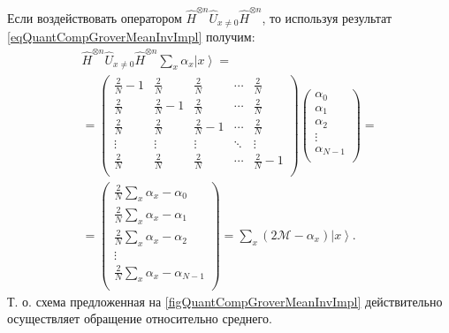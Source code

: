 Если воздействовать оператором $\hat{H}^{\otimes n}\hat{U}_{x \ne
  0}\hat{H}^{\otimes n}$, то используя результат
\eqref{eqQuantCompGroverMeanInvImpl} получим:
\begin{eqnarray}
\hat{H}^{\otimes n}\hat{U}_{x \ne
  0}\hat{H}^{\otimes n} \sum_x \alpha_x \left| x \right> = 
\nonumber \\
=
\begin{pmatrix}
\frac{2}{N} - 1  & \frac{2}{N} & \frac{2}{N} & \cdots & \frac{2}{N} \\
\frac{2}{N} & \frac{2}{N} - 1 & \frac{2}{N} & \cdots & \frac{2}{N} \\
\frac{2}{N} & \frac{2}{N} & \frac{2}{N} - 1 & \cdots & \frac{2}{N} \\
\vdots & \vdots & \vdots & \ddots & \vdots \\
\frac{2}{N} & \frac{2}{N} & \frac{2}{N} & \cdots & \frac{2}{N} - 1\\
\end{pmatrix}
\begin{pmatrix}
\alpha_0 \\
\alpha_1 \\
\alpha_2 \\
\vdots \\
\alpha_{N - 1} \\
\end{pmatrix}
=
\nonumber \\
=
\begin{pmatrix}
\frac{2}{N}\sum_x\alpha_x - \alpha_0\\
\frac{2}{N}\sum_x\alpha_x - \alpha_1\\
\frac{2}{N}\sum_x\alpha_x - \alpha_2\\
\vdots \\
\frac{2}{N}\sum_x\alpha_x - \alpha_{N-1}\\
\end{pmatrix} = 
\sum_x \left(2 \mathcal{M} - \alpha_x \right)\left| x \right>.
\nonumber
\end{eqnarray}
Т. о. схема предложенная на \autoref{figQuantCompGroverMeanInvImpl}
действительно осуществляет обращение относительно среднего.
